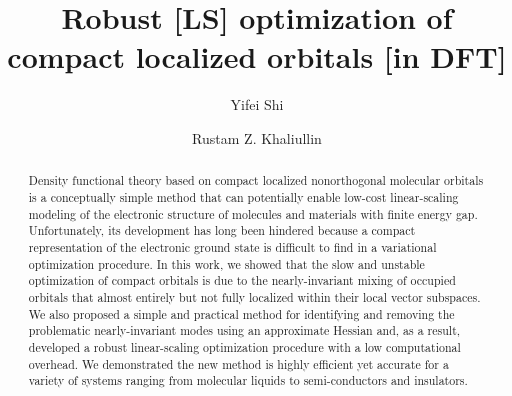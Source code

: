 \documentclass[aps,prl,twocolumn,reprint,amsmath,amssymb]{revtex4-1}
\begin{document}
\newcommand{\Ang}{\ensuremath{\mathring{\text{A}}}}
\newcommand{\ltwid}{\mathrel{\raise.3ex\hbox{$<$\kern-.75em\lower1ex\hbox{$\sim$}}}}
\newcommand{\gtwid}{\mathrel{\raise.3ex\hbox{$>$\kern-.75em\lower1ex\hbox{$\sim$}}}}
\newcommand{\ket}[1]{\ensuremath{\vert #1 \rangle}}
\newcommand{\bra}[1]{\ensuremath{\langle #1 \vert}}
\newcommand{\braket}[2]{\ensuremath{\langle #1 \vert #2 \rangle}} %
\newcommand{\ketbra}[2]{\ensuremath{\vert #1 \rangle \langle #2 \vert}} %
\newcommand{\op}[1]{\ensuremath{\hat{#1}}} %
\newcommand{\sill}{\psi}
\newcommand{\trace}{{\rm Tr}}
\newcommand{\ntilde}{\tilde{n}}
\newcommand{\stilde}{\tilde{s}}
\newcommand{\atilde}{\tilde{\alpha}}
\newcommand{\new}{\color{red}}
\newcommand{\old}{\color{black}}
\newcommand{\bea}{\begin{eqnarray}}
\newcommand{\eea}{\end{eqnarray}}
\newcommand{\br}{\ensuremath{\mathbf{r}}}
\def\nn{\nonumber\\}



\title{Robust [LS] optimization of compact localized orbitals [in DFT]}

\author{Yifei Shi}
\author{Rustam Z. Khaliullin}


\begin{abstract}
Density functional theory based on compact localized nonorthogonal molecular orbitals is a conceptually simple method that can potentially enable low-cost linear-scaling modeling of the electronic structure of molecules and materials with finite energy gap. 
Unfortunately, its development has long been hindered because a compact representation of the electronic ground state is difficult to find in a variational optimization procedure. 
In this work, we showed that the slow and unstable optimization of compact orbitals is due to the nearly-invariant mixing of occupied orbitals that almost entirely but not fully localized within their local vector subspaces. 
We also proposed a simple and practical method for identifying and removing the problematic nearly-invariant modes using an approximate Hessian and, as a result, developed a robust linear-scaling optimization procedure with a low computational overhead.  
We demonstrated the new method is highly efficient yet accurate for a variety of systems ranging from molecular liquids to semi-conductors and insulators.  
\end{abstract}
\maketitle
\end{document}
